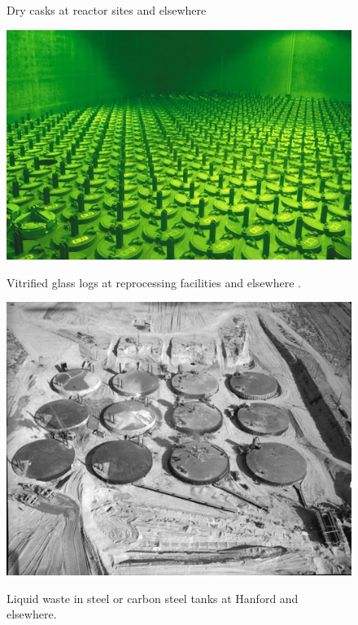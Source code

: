 \begin{figure}[htbp!]
\begin{center}
\begin{minipage}[t]{0.45\textwidth}
      \caption{Dry casks at reactor sites and elsewhere \cite{nrc_dry_2008}}
        \label{fig:casks}
    \end{minipage}
    \hspace{0.01\textwidth}
    \begin{minipage}[t]{0.45\textwidth}
      \includegraphics[height=0.4\textheight]{logs.eps}
        \caption{Vitrified glass logs at reprocessing facilities and elsewhere 
          \cite{essick_photographing_2012}.}
        \label{fig:logs}
      \includegraphics[height=0.4\textheight]{tanks.eps}
        \caption{Liquid waste in steel or carbon steel tanks at Hanford and 
          elsewhere\cite{doe_underground_????}.}
        \label{fig:tanks}
    \end{minipage}
    \end{center}
  \end{figure}
